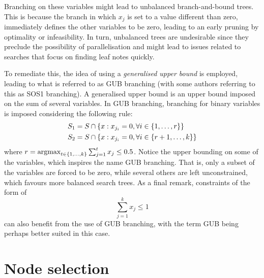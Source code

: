 Branching on these variables might lead to unbalanced branch-and-bound trees. This is because the branch in which $x_j$ is set to a value different than zero, immediately defines the other variables to be zero, leading to an early pruning by optimality or infeasibility. In turn, unbalanced trees are undesirable since they preclude the possibility of parallelisation and might lead to issues related to searches that focus on finding leaf notes quickly.

To remediate this, the idea of using a \emph{generalised upper bound} is employed, leading to what is referred to as GUB branching (with some authors referring to this as SOS1 branching). A generalised upper bound is an upper bound imposed on the sum of several variables. In GUB branching, branching for binary variables is imposed considering the following rule:
%
\begin{align*}
	&S_1 = S \cap \left\{ x : x_{j_i} = 0, \forall i \in \left\{ 1,\dots,r \right \}  \right \} \\
	&S_2 = S \cap \left\{ x : x_{j_i} = 0, \forall i \in \left\{ r+1,\dots,k \right \}  \right \}
\end{align*} 
%
where $r = \mathop{\rm argmax}_{t \in \left\{ 1,\dots,k \right \}} \sum_{j=1}^t x_j \leq 0.5$. Notice the upper bounding on some of the variables, which inspires the name GUB branching. That is, only a subset of the variables are forced to be zero, while several others are left unconstrained, which favours more balanced search trees. As a final remark, constraints of the form of
%
\begin{equation*}
	\sum_{j = 1}^k x_j \le 1	
\end{equation*}
%
can also benefit from the use of GUB branching, with the term GUB being perhaps better suited in this case. 


\section{Node selection}

